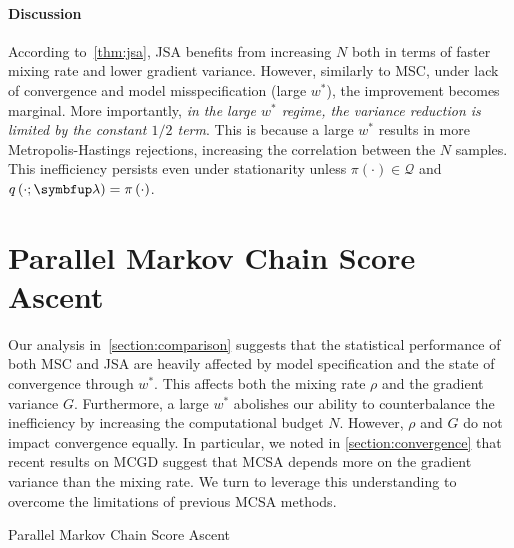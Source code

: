 \paragraph{Discussion}
According to~\cref{thm:jsa}, JSA benefits from increasing \(N\) both in terms of faster mixing rate and lower gradient variance.
However, similarly to MSC, under lack of convergence and model misspecification (large \(w^*\)), the improvement becomes marginal.
More importantly, \textit{in the large \(w^*\) regime, the variance reduction is limited by the constant \(1/2\) term}.
This is because a large \(w^*\) results in more Metropolis-Hastings rejections, increasing the correlation between the \(N\) samples.
This inefficiency persists even under stationarity unless \(\pi\left(\cdot\right) \in \mathcal{Q}\) and \(q\left(\cdot; \vlambda\right) = \pi\left(\cdot\right)\).


\vspace{-0.05in}
\section{Parallel Markov Chain Score Ascent}\label{section:pmcsa}
\vspace{-0.12in}
Our analysis in~\cref{section:comparison} suggests that the statistical performance of both MSC and JSA are heavily affected by model specification and the state of convergence through \(w^*\).
This affects both the mixing rate \(\rho\) and the gradient variance \(G\).
Furthermore, a large \(w^*\) abolishes our ability to counterbalance the inefficiency by increasing the computational budget \(N\).
However, \(\rho\) and \(G\) do not impact convergence equally.
In particular, we noted in \cref{section:convergence} that recent results on MCGD suggest that MCSA depends more on the gradient variance than the mixing rate.
We turn to leverage this understanding to overcome the limitations of previous MCSA methods.

\begin{center}
\begin{minipage}[c]{0.8\textwidth}
  \begin{algorithm2e}[H]
    \DontPrintSemicolon
    \SetAlgoLined
    \caption{Parallel Markov Chain Score Ascent}\label{alg:pmcsa}
  \end{algorithm2e}
\end{minipage}
\end{center}

